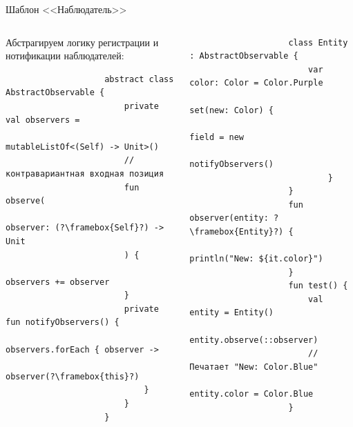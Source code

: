 \documentclass[usenames, dvipsnames]{beamer}
\begin{document}
    \begin{frame}[fragile]{Шаблон <<Наблюдатель>>}
        \begin{columns}
            \begin{column}{0.48\textwidth}
                Абстрагируем логику регистрации и нотификации наблюдателей:
                \begin{verbatim}
                    abstract class AbstractObservable {
                        private val observers =
                            mutableListOf<(Self) -> Unit>()
                        // контравариантная входная позиция
                        fun observe(
                            observer: (?\framebox{Self}?) -> Unit
                        ) {
                            observers += observer
                        }
                        private fun notifyObservers() {
                            observers.forEach { observer ->
                                observer(?\framebox{this}?)
                            }
                        }
                    }
                \end{verbatim}
            \end{column}

            \begin{column}{0.49\textwidth}
                \vspace{-0.5em}
                \begin{verbatim}
                    class Entity : AbstractObservable {
                        var color: Color = Color.Purple
                            set(new: Color) {
                                field = new
                                notifyObservers()
                            }
                    }
                    fun observer(entity: ?\framebox{Entity}?) {
                        println("New: ${it.color}")
                    }
                    fun test() {
                        val entity = Entity()
                        entity.observe(::observer)
                        // Печатает "New: Color.Blue"
                        entity.color = Color.Blue
                    }
                \end{verbatim}
            \end{column}
        \end{columns}
    \end{frame}
\end{document}
